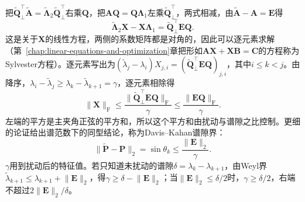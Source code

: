 把$\widetilde{\bm Q}_\perp^\top\widetilde{\bm A}=\widetilde{\bm\Lambda}_2\widetilde{\bm Q}_\perp^\top$右乘$\bm Q$，把$\bm A\bm Q=\bm Q\bm\Lambda_1$左乘$\widetilde{\bm Q}_\perp^\top$，两式相减，由$\widetilde{\bm A}-\bm A=\bm E$得
\[
 \widetilde{\bm\Lambda}_2\bm X-\bm X\bm\Lambda_1=\widetilde{\bm Q}_\perp^\top\bm E\bm Q .
\]
这是关于$\bm X$的线性方程，两侧的系数矩阵都是对角的，因此可以逐元素求解（第~\ref{chap:linear-equations-and-optimization}章把形如$\bm A\bm X+\bm X\bm B=\bm C$的方程称为Sylvester方程）。逐元素写出为$(\widetilde\lambda_j-\lambda_i)X_{j,i}=(\widetilde{\bm Q}_\perp^\top\bm E\bm Q)_{j,i}$，其中$i\leq k<j$。由降序，$\lambda_i-\widetilde\lambda_j\geq\lambda_k-\widetilde\lambda_{k+1}=\gamma$，逐元素相除得
\[
 \lVert\bm X\rVert_{\mathrm F}\leq\frac{\lVert\widetilde{\bm Q}_\perp^\top\bm E\bm Q\rVert_{\mathrm F}}{\gamma}\leq\frac{\lVert\bm E\bm Q\rVert_{\mathrm F}}{\gamma}.
\]
左端的平方是主夹角正弦的平方和，所以这个平方和由扰动与谱隙之比控制。更细的论证给出谱范数下的同型结论，称为Davis--Kahan谱隙界：
\begin{equation}
 \lVert\widetilde{\bm P}-\bm P\rVert_2=\sin\theta_{k}
 \leq\frac{\lVert\bm E\rVert_2}{\gamma}.
 \label{eq:matrix-analysis-eigenvector-gap-bound}
\end{equation}
$\gamma$用到扰动后的特征值。若只知道未扰动的谱隙$\delta=\lambda_k-\lambda_{k+1}$，由Weyl界$\widetilde\lambda_{k+1}\leq\lambda_{k+1}+\lVert\bm E\rVert_2$，得$\gamma\geq\delta-\lVert\bm E\rVert_2$；当$\lVert\bm E\rVert_2\leq\delta/2$时，$\gamma\geq\delta/2$，右端不超过$2\lVert\bm E\rVert_2/\delta$。

